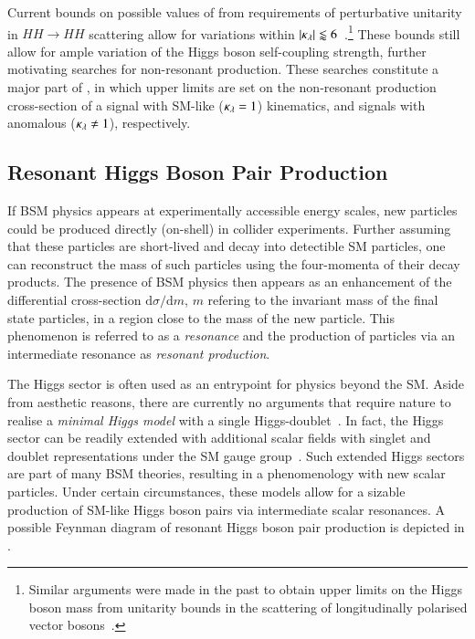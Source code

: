 %
Current bounds on possible values of \klambda from requirements of perturbative
unitarity in $HH \to HH$ scattering allow for variations within
$|\kappa_{\lambda}| \lessapprox 6$~\cite{DiLuzio:2017tfn}.\footnote{Similar arguments
  were made in the past to obtain upper limits on the Higgs boson mass from
  unitarity bounds in the scattering of longitudinally polarised vector
  bosons~\cite{Lee:1977eg}.} These bounds still allow for ample variation of the
Higgs boson self-coupling strength, further motivating searches for non-resonant
\HH production. These searches constitute a major part of
, in which upper limits are set on the
non-resonant \HH production cross-section of a signal with SM-like
($\kappa_{\lambda} = 1$) kinematics, and signals with anomalous \klambda
($\kappa_{\lambda} \neq 1$), respectively.



\subsection{Resonant Higgs Boson Pair Production}%
\label{sec:bsm_resonant_hh}

If BSM physics appears at experimentally accessible energy scales, new particles
could be produced directly (on-shell) in collider experiments. Further assuming
that these particles are short-lived and decay into detectible SM particles, one
can reconstruct the mass of such particles using the four-momenta of their decay
products. The presence of BSM physics then appears as an enhancement of the
differential cross-section $\mathrm{d}\sigma / \mathrm{d}m$, $m$ refering to the
invariant mass of the final state particles, in a region close to the mass of
the new particle. This phenomenon is referred to as a \emph{resonance} and the
production of particles via an intermediate resonance as \emph{resonant
  production}.

The Higgs sector is often used as an entrypoint for physics beyond the SM. Aside
from aesthetic reasons, there are currently no arguments that require nature to
realise a \emph{minimal Higgs model} with a single
Higgs-doublet~\cite{Gunion:1989we}. In fact, the Higgs sector can be readily
extended with additional scalar fields with singlet and doublet representations
under the SM gauge group~\cite{Gunion:1989we}. Such extended Higgs sectors are
part of many BSM theories, resulting in a phenomenology with new scalar
particles. Under certain circumstances, these models allow for a sizable
production of SM-like Higgs boson pairs via intermediate scalar resonances. A
possible Feynman diagram of resonant Higgs boson pair production is depicted in
.


